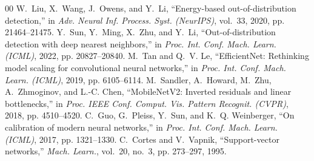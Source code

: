 \documentclass[conference]{IEEEtran}
\begin{document}
\begin{thebibliography}{00}
W.~Liu, X.~Wang, J.~Owens, and Y.~Li, ``Energy-based out-of-distribution detection,'' in \emph{Adv. Neural Inf. Process. Syst. (NeurIPS)}, vol.~33, 2020, pp. 21464--21475.
Y.~Sun, Y.~Ming, X.~Zhu, and Y.~Li, ``Out-of-distribution detection with deep nearest neighbors,'' in \emph{Proc. Int. Conf. Mach. Learn. (ICML)}, 2022, pp. 20827--20840.
M.~Tan and Q.~V. Le, ``EfficientNet: Rethinking model scaling for convolutional neural networks,'' in \emph{Proc. Int. Conf. Mach. Learn. (ICML)}, 2019, pp. 6105--6114.
M.~Sandler, A.~Howard, M.~Zhu, A.~Zhmoginov, and L.-C. Chen, ``MobileNetV2: Inverted residuals and linear bottlenecks,'' in \emph{Proc. IEEE Conf. Comput. Vis. Pattern Recognit. (CVPR)}, 2018, pp. 4510--4520.
C.~Guo, G.~Pleiss, Y.~Sun, and K.~Q. Weinberger, ``On calibration of modern neural networks,'' in \emph{Proc. Int. Conf. Mach. Learn. (ICML)}, 2017, pp. 1321--1330.
C.~Cortes and V.~Vapnik, ``Support-vector networks,'' \emph{Mach. Learn.}, vol.~20, no.~3, pp. 273--297, 1995.
\end{thebibliography}
\end{document}
